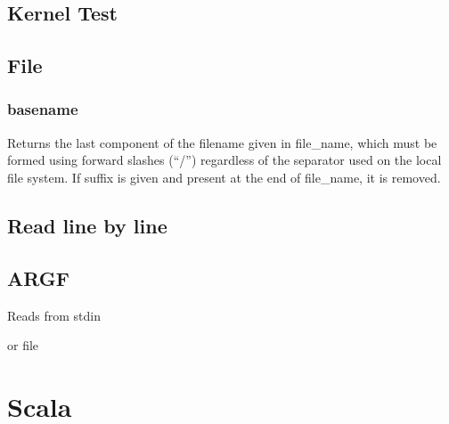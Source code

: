 \documentclass[12pt]{article}
\begin{document}
\subsection{Kernel Test}




\subsection{File}

\subsubsection{basename}

Returns the last component of the filename given in file\_name, which must be formed using forward slashes (“/”) regardless of 
the separator used on the local file system. If suffix is given and present at the end of file\_name, it is removed.



\subsection{Read line by line}





\subsection{ARGF}

Reads from stdin



or file





\section{Scala}
\end{document}

